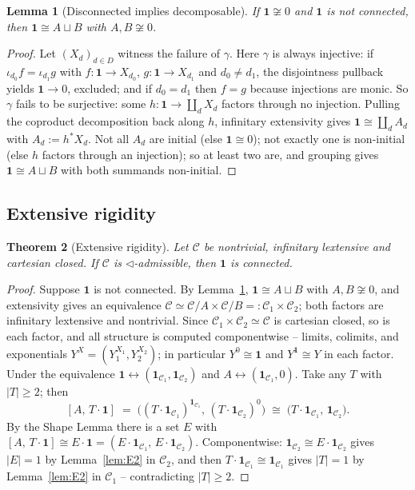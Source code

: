 \documentclass[11pt]{amsart}
\theoremstyle{plain}
\newtheorem{theorem}{Theorem}[section]
\newtheorem{lemma}[theorem]{Lemma}
\theoremstyle{definition}
\newcommand{\C}{\mathcal{C}}
\newcommand{\comp}{\mathbin{\triangleleft}}
\newcommand{\one}{\mathbf{1}}
\begin{document}
\begin{lemma}[Disconnected implies decomposable]\label{lem:E0}
If $\one\not\cong 0$ and $\one$ is not connected, then $\one\cong A\sqcup B$ with $A,B\not\cong 0$.
\end{lemma}
\begin{proof}
Let $(X_d)_{d\in D}$ witness the failure of $\gamma$. Here $\gamma$ is always injective: if
$\iota_{d_0}f=\iota_{d_1}g$ with $f:\one\to X_{d_0}$, $g:\one\to X_{d_1}$ and $d_0\neq d_1$, the
disjointness pullback yields $\one\to 0$, excluded; and if $d_0=d_1$ then $f=g$ because injections are
monic. So $\gamma$ fails to be surjective: some $h:\one\to\coprod_d X_d$ factors through no injection.
Pulling the coproduct decomposition back along $h$, infinitary extensivity gives
$\one\cong\coprod_d A_d$ with $A_d:=h^*X_d$. Not all $A_d$ are initial (else $\one\cong 0$); not
exactly one is non-initial (else $h$ factors through an injection); so at least two are, and grouping
gives $\one\cong A\sqcup B$ with both summands non-initial.
\end{proof}

\subsection{Extensive rigidity}

\begin{theorem}[Extensive rigidity]\label{thm:B}
Let $\C$ be nontrivial, infinitary lextensive and cartesian closed. If $\C$ is $\comp$-admissible,
then $\one$ is connected.
\end{theorem}
\begin{proof}
Suppose $\one$ is not connected. By Lemma~\ref{lem:E0}, $\one\cong A\sqcup B$ with $A,B\not\cong 0$,
and extensivity gives an equivalence $\C\simeq\C/A\times\C/B=:\C_1\times\C_2$; both factors are
infinitary lextensive and nontrivial. Since $\C_1\times\C_2\simeq\C$ is cartesian closed, so is each
factor, and all structure is computed componentwise -- limits, colimits, and exponentials
$Y^X=(Y_1^{X_1},Y_2^{X_2})$; in particular $Y^0\cong\one$ and $Y^{\one}\cong Y$ in each factor. Under
the equivalence $\one\leftrightarrow(\one_{\C_1},\one_{\C_2})$ and
$A\leftrightarrow(\one_{\C_1},0)$. Take any $T$ with $|T|\ge 2$; then
\[
   [A,\,T\cdot\one]\;=\;\big((T\cdot\one_{\C_1})^{\one_{\C_1}},\,(T\cdot\one_{\C_2})^{0}\big)
   \;\cong\;\big(T\cdot\one_{\C_1},\,\one_{\C_2}\big).
\]
By the Shape Lemma there is a set $E$ with $[A,\,T\cdot\one]\cong E\cdot\one=(E\cdot\one_{\C_1},\,
E\cdot\one_{\C_2})$. Componentwise: $\one_{\C_2}\cong E\cdot\one_{\C_2}$ gives $|E|=1$ by
Lemma~\ref{lem:E2} in $\C_2$, and then $T\cdot\one_{\C_1}\cong\one_{\C_1}$ gives $|T|=1$ by
Lemma~\ref{lem:E2} in $\C_1$ -- contradicting $|T|\ge 2$.
\end{proof}
\end{document}
